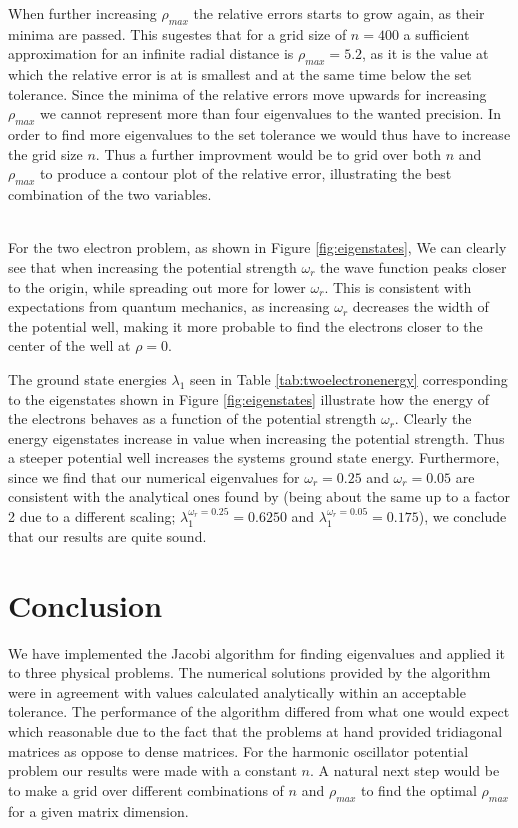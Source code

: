 \documentclass[twocolumn]{aastex62}
\begin{document}
When further increasing $\rho_{max}$ the relative errors starts to grow again, as their minima are passed. This sugestes that for a grid size of $n = 400$ a sufficient approximation for an infinite radial distance is $\rho_{max} = 5.2$, as it is the value at which the relative error is at is smallest and at the same time below the set tolerance. Since the minima of the relative errors move upwards for increasing $\rho_{max}$ we cannot represent more than four eigenvalues to the wanted precision. In order to find more eigenvalues to the set tolerance we would thus have to increase the grid size $n$. Thus a further improvment would be to grid over both $n$ and $\rho_{max}$ to produce a contour plot of the relative error, illustrating the best combination of the two variables.\\\\\indent

For the two electron problem, as shown in Figure \ref{fig:eigenstates}, We can clearly see that when increasing the potential strength $\omega_r$ the wave function peaks closer to the origin, while spreading out more for lower $\omega_r$. This is consistent with expectations from quantum mechanics, as increasing $\omega_r$ decreases the width of the potential well, making it more probable to find the electrons closer to the center of the well at $\rho = 0$.

The ground state energies $\lambda_1$ seen in Table \ref{tab:twoelectronenergy} corresponding to the eigenstates shown in Figure \ref{fig:eigenstates} illustrate how the energy of the electrons behaves as a function of the potential strength $\omega_r$. Clearly the energy eigenstates increase in value when increasing the potential strength. Thus a steeper potential well increases the systems ground state energy. Furthermore, since we find that our numerical eigenvalues for $\omega_r = 0.25$ and $\omega_r = 0.05$ are consistent with the analytical ones found by \cite{taut:1993} (being about the same up to a factor 2 due to a different scaling; $\lambda_1^{\omega_r = 0.25} = 0.6250$ and $\lambda_1^{\omega_r = 0.05} = 0.175$), we conclude that our results are quite sound.

\section{Conclusion} \label{sec:conclusion}
We have implemented the Jacobi algorithm for finding eigenvalues and applied it to three physical problems. The numerical solutions provided by the algorithm were in agreement with values calculated analytically within an acceptable tolerance. The performance of the algorithm differed from what one would expect which reasonable due to the fact that the problems at hand provided tridiagonal matrices as oppose to dense matrices. For the harmonic oscillator potential problem our results were made with a constant $n$. A natural next step would be to make a grid over different combinations of $n$ and $\rho_{max}$ to find the optimal $\rho_{max}$ for a given matrix dimension.
\end{document}
